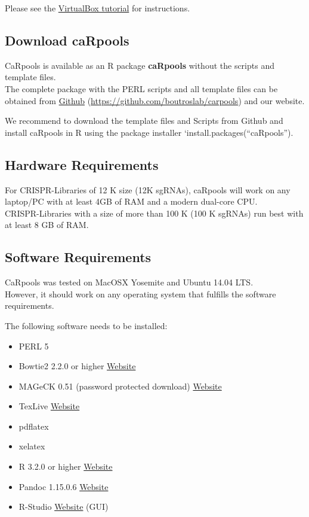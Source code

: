 \documentclass[]{article}
\providecommand{\tightlist}{%
  \setlength{\itemsep}{0pt}\setlength{\parskip}{0pt}}
\begin{document}
Please see the
\href{https://github.com/boutroslab/caRpools/blob/master/docs/CaRpools-SHORTGUIDE-VirtualBox.Rmd}{VirtualBox
tutorial} for instructions.

\subsection{Download caRpools}\label{download-carpools-1}

CaRpools is available as an R package \textbf{caRpools} without the
scripts and template files.\\
The complete package with the PERL scripts and all template files can be
obtained from \href{https://github.com/boutroslab/carpools}{Github}
(\url{https://github.com/boutroslab/carpools}) and our website.

We recommend to download the template files and Scripts from Github and
install caRpools in R using the package installer
`install.packages(``caRpools'').

\subsection{Hardware Requirements}\label{hardware-requirements}

For CRISPR-Libraries of 12 K size (12K sgRNAs), caRpools will work on
any laptop/PC with at least 4GB of RAM and a modern dual-core CPU.\\
CRISPR-Libraries with a size of more than 100 K (100 K sgRNAs) run best
with at least 8 GB of RAM.

\subsection{Software Requirements}\label{software-requirements}

CaRpools was tested on MacOSX Yosemite and Ubuntu 14.04 LTS.\\
However, it should work on any operating system that fulfills the
software requirements.

The following software needs to be installed:

\begin{itemize}
\tightlist
\item
  PERL 5
\item
  Bowtie2 2.2.0 or higher
  \href{http://bowtie-bio.sourceforge.net/bowtie2/index.shtml}{Website}
\item
  MAGeCK 0.51 (password protected download)
  \href{http://sourceforge.net/p/mageck/wiki/Home/}{Website}
\item
  TexLive \href{https://www.tug.org/texlive/}{Website}
\item
  pdflatex
\item
  xelatex
\item
  R 3.2.0 or higher \href{https://www.r-project.org/}{Website}
\item
  Pandoc 1.15.0.6 \href{http://www.http://pandoc.org/}{Website}
\item
  R-Studio \href{http://www.rstudio.com}{Website} (GUI)
\end{itemize}
\end{document}
